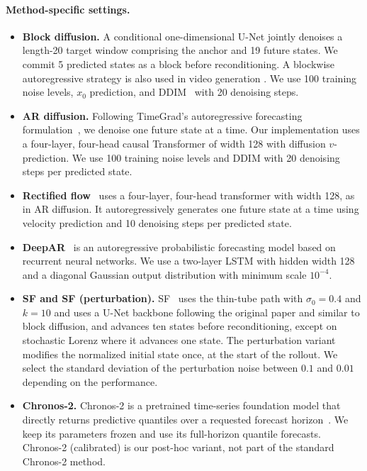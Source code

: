 \paragraph{Method-specific settings.}
\begin{itemize}
  \item \textbf{Block diffusion.} A conditional one-dimensional U-Net jointly denoises a length-20 target window comprising the anchor and 19 future states. We commit 5 predicted states as a block before reconditioning. A blockwise autoregressive strategy is also used in video generation \citep{voleti2022MCVD, ho2022video}. We use 100 training noise levels, $x_0$ prediction, and DDIM~\citep{song2020denoising} with 20 denoising steps.

  \item \textbf{AR diffusion.} Following TimeGrad's autoregressive forecasting formulation~\citep{rasul2021timegrad}, we denoise one future state at a time. Our implementation uses a four-layer, four-head causal Transformer \citep{peebles2023scalable} of width 128 with diffusion $v$-prediction. We use 100 training noise levels and DDIM with 20 denoising steps per predicted state.

  \item \textbf{Rectified flow}~\citep{liu2022flow} uses a four-layer, four-head transformer with width
  128, as in AR diffusion. It autoregressively generates one future state at a time using velocity
  prediction and 10 denoising steps per predicted state.
  
  \item \textbf{DeepAR}~\citep{salinas2020deepar} is an autoregressive probabilistic forecasting model based on recurrent neural networks. We use a two-layer LSTM with hidden width 128 and a
  diagonal Gaussian output distribution with minimum scale $10^{-4}$.

  \item \textbf{SF and SF (perturbation).} SF~\citep{jiang2025streaming} uses the thin-tube path with
  $\sigma_0=0.4$ and $k=10$ and uses a U-Net backbone following the original paper and similar to block diffusion, and advances ten states before reconditioning,
  except on stochastic Lorenz where it advances one state.
  The perturbation variant modifies the normalized initial state once, at the
  start of the rollout.  We select the standard deviation of the perturbation noise  between $0.1$ and $0.01$ depending on the performance.

  \item \textbf{Chronos-2.} Chronos-2 is a pretrained time-series foundation
  model that directly returns predictive quantiles over a requested forecast
  horizon~\citep{ansari2025chronos}.  We keep its parameters frozen and use
  its full-horizon quantile forecasts.  Chronos-2 (calibrated) is our post-hoc
  variant, not part of the standard Chronos-2 method.


\end{itemize}
